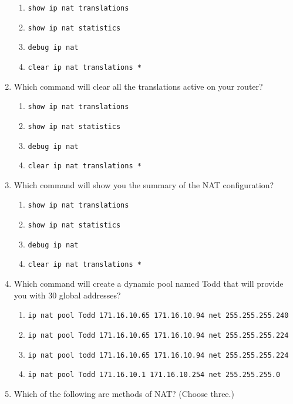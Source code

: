 \documentclass[b5paper,11pt]{memoir}
\begin{document}
\begin{enumerate}
  \begin{enumerate}
  \tightlist
  \item
    \texttt{show\ ip\ nat\ translations}
  \item
    \texttt{show\ ip\ nat\ statistics}
  \item
    \texttt{debug\ ip\ nat}
  \item
    \texttt{clear\ ip\ nat\ translations\ *}
  \end{enumerate}
\item
  Which command will clear all the translations active on your router?

  \begin{enumerate}
  \tightlist
  \item
    \texttt{show\ ip\ nat\ translations}
  \item
    \texttt{show\ ip\ nat\ statistics}
  \item
    \texttt{debug\ ip\ nat}
  \item
    \texttt{clear\ ip\ nat\ translations\ *}
  \end{enumerate}
\item
  Which command will show you the summary of the NAT configuration?

  \begin{enumerate}
  \tightlist
  \item
    \texttt{show\ ip\ nat\ translations}
  \item
    \texttt{show\ ip\ nat\ statistics}
  \item
    \texttt{debug\ ip\ nat}
  \item
    \texttt{clear\ ip\ nat\ translations\ *}
  \end{enumerate}
\item
  Which command will create a dynamic pool named Todd that will provide
  you with 30 global addresses?

  \begin{enumerate}
  \tightlist
  \item
    \texttt{ip\ nat\ pool\ Todd\ 171.16.10.65\ 171.16.10.94\ net\ 255.255.255.240}
  \item
    \texttt{ip\ nat\ pool\ Todd\ 171.16.10.65\ 171.16.10.94\ net\ 255.255.255.224}
  \item
    \texttt{ip\ nat\ pool\ todd\ 171.16.10.65\ 171.16.10.94\ net\ 255.255.255.224}
  \item
    \texttt{ip\ nat\ pool\ Todd\ 171.16.10.1\ 171.16.10.254\ net\ 255.255.255.0}
  \end{enumerate}
\item
  Which of the following are methods of NAT? (Choose three.)


\end{enumerate}
\end{document}
